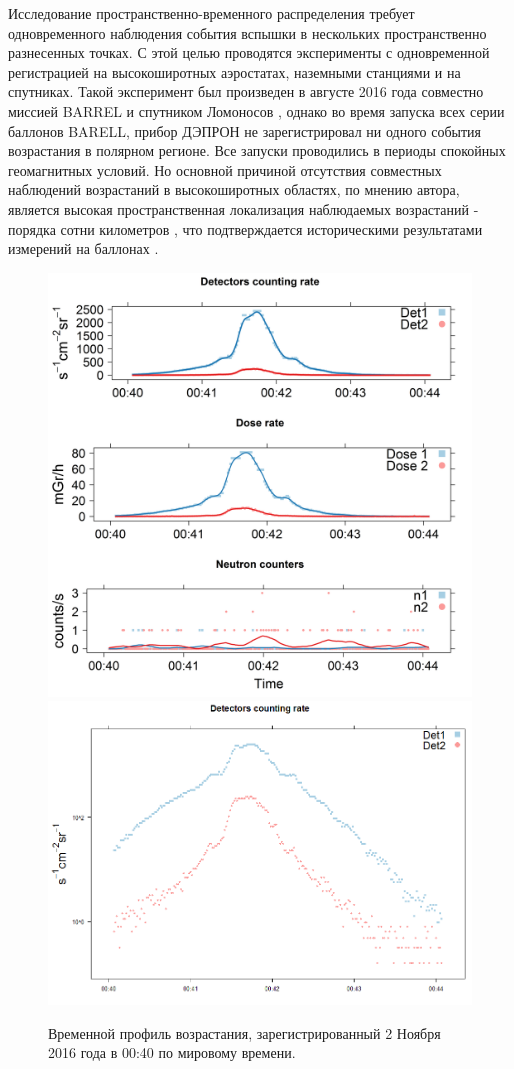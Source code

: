 Исследование пространственно-временного распределения требует одновременного наблюдения события вспышки в нескольких пространственно разнесенных точках. С этой целью проводятся эксперименты с одновременной регистрацией на высокоширотных аэростатах, наземными станциями и на спутниках. Такой эксперимент был произведен в августе 2016 года совместно миссией BARREL и спутником Ломоносов \cite{Fairbrother2017}, однако во время запуска всех серии баллонов BARELL, прибор ДЭПРОН не зарегистрировал ни одного события возрастания в полярном регионе. Все запуски проводились в периоды спокойных геомагнитных условий. Но основной причиной отсутствия совместных наблюдений возрастаний в высокоширотных областях, по мнению автора, является высокая пространственная локализация наблюдаемых возрастаний - порядка сотни километров , что подтверждается историческими результатами измерений на баллонах \cite{Brown1966}. 
\begin{figure}
	\centering
	\includegraphics[width=0.49\linewidth]{images/Flash/depron_sec_log_new11-02-16}
	\includegraphics[width=0.49\linewidth]{images/Flash/depron_sec_log_new11-02-161}
	\caption{Временной профиль возрастания, зарегистрированный 2 Ноября 2016 года в 00:40 по мировому времени.}
	\label{fig:depronseclognew11-02-16}
\end{figure}





